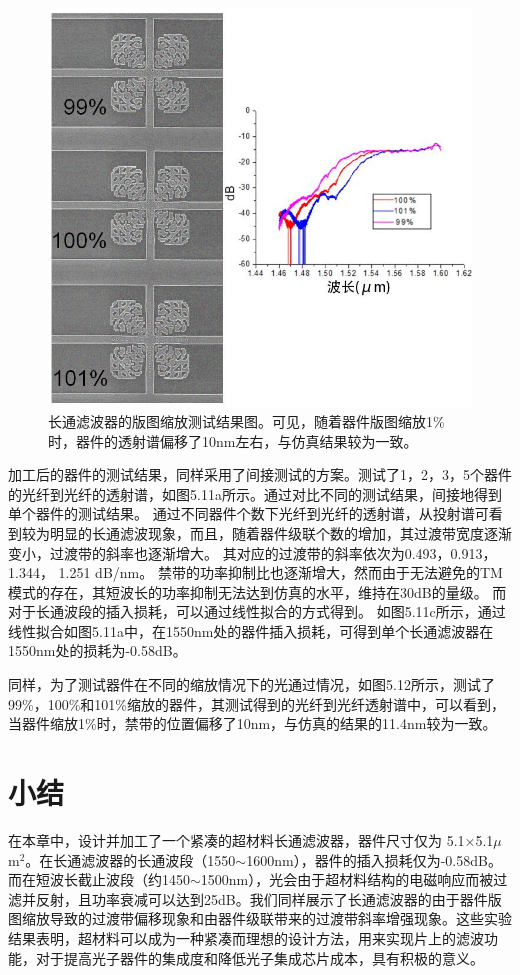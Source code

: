 \begin{figure}[!htbp]
    \centering
    \includegraphics[width=1\textwidth]{Img/5-12.png}
    \caption{长通滤波器的版图缩放测试结果图。可见，随着器件版图缩放1\%时，器件的透射谱偏移了10nm左右，与仿真结果较为一致。}
    \label{fig:5-12}
\end{figure}

加工后的器件的测试结果，同样采用了间接测试的方案。测试了1，2，3，5个器件的光纤到光纤的透射谱，如图5.11a所示。通过对比不同的测试结果，间接地得到单个器件的测试结果。
通过不同器件个数下光纤到光纤的透射谱，从投射谱可看到较为明显的长通滤波现象，而且，随着器件级联个数的增加，其过渡带宽度逐渐变小，过渡带的斜率也逐渐增大。
其对应的过渡带的斜率依次为0.493，0.913， 1.344， 1.251 dB/nm。
禁带的功率抑制比也逐渐增大，然而由于无法避免的TM模式的存在，其短波长的功率抑制无法达到仿真的水平，维持在30dB的量级。
而对于长通波段的插入损耗，可以通过线性拟合的方式得到。
如图5.11c所示，通过线性拟合如图5.11a中，在1550nm处的器件插入损耗，可得到单个长通滤波器在1550nm处的损耗为-0.58dB。

同样，为了测试器件在不同的缩放情况下的光通过情况，如图5.12所示，测试了99\%，100\%和101\%缩放的器件，其测试得到的光纤到光纤透射谱中，可以看到，当器件缩放1\%时，禁带的位置偏移了10nm，与仿真的结果的11.4nm较为一致。

\section{小结}

在本章中，设计并加工了一个紧凑的超材料长通滤波器，器件尺寸仅为 5.1×5.1$\mu$m$^2$。在长通滤波器的长通波段（1550$\sim$1600nm），器件的插入损耗仅为-0.58dB。而在短波长截止波段（约1450$\sim$1500nm），光会由于超材料结构的电磁响应而被过滤并反射，且功率衰减可以达到25dB。我们同样展示了长通滤波器的由于器件版图缩放导致的过渡带偏移现象和由器件级联带来的过渡带斜率增强现象。这些实验结果表明，超材料可以成为一种紧凑而理想的设计方法，用来实现片上的滤波功能，对于提高光子器件的集成度和降低光子集成芯片成本，具有积极的意义。

